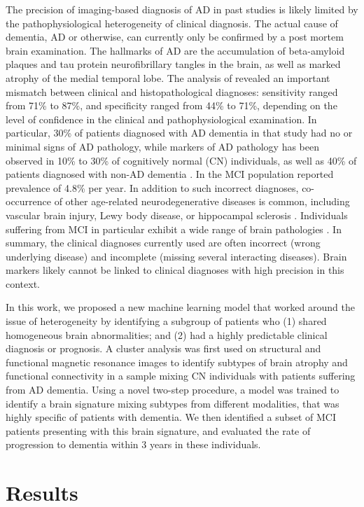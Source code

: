 \documentclass[authoryear]{elsarticle}
\begin{document}
The precision of imaging-based diagnosis of AD in past studies is likely limited by the pathophysiological heterogeneity of clinical diagnosis. The actual cause of dementia, AD or otherwise, can currently only be confirmed by a post mortem brain examination. The hallmarks of AD are the accumulation of beta-amyloid  plaques and tau protein neurofibrillary tangles in the brain, as well as marked atrophy of the medial temporal lobe. The analysis of \cite{Beach2012} revealed an important mismatch between clinical and histopathological diagnoses: sensitivity ranged from 71\% to 87\%, and specificity ranged from 44\% to 71\%, depending on the level of confidence in the clinical and pathophysiological examination. In particular, 30\% of patients diagnosed with AD dementia in that study had no or minimal signs of AD pathology, while markers of AD pathology has been observed in 10\% to 30\% of cognitively normal (CN) individuals, as well as 40\% of patients diagnosed with non-AD dementia \citep{Beach2012}. In the MCI population \cite{Petersen2014} reported prevalence of 4.8\% per year. In addition to such incorrect diagnoses, co-occurrence of other age-related neurodegenerative diseases is common, including vascular brain injury, Lewy body disease, or hippocampal sclerosis \cite{Rabinovici2017,Jellinger2014}. Individuals suffering from MCI in particular exhibit a wide range of brain pathologies \citep{Stephan2012}. In summary, the clinical diagnoses currently used are often incorrect (wrong underlying disease) and incomplete (missing several interacting diseases). Brain markers likely cannot be linked to clinical diagnoses with high precision in this context. 

In this work, we proposed a new machine learning model that worked around the issue of heterogeneity by identifying a subgroup of patients who (1) shared homogeneous brain abnormalities; and (2) had a highly predictable clinical diagnosis or prognosis. A cluster analysis was first used on structural and functional magnetic resonance images to identify subtypes of brain atrophy and functional connectivity in a sample mixing CN individuals with patients suffering from AD dementia. Using a novel two-step procedure, a model was trained to identify a brain signature mixing subtypes from different modalities, that was highly specific of patients with dementia. We then identified a subset of MCI patients presenting with this brain signature, and evaluated the rate of progression to dementia within 3 years in these individuals.

\section{Results}
\end{document}
